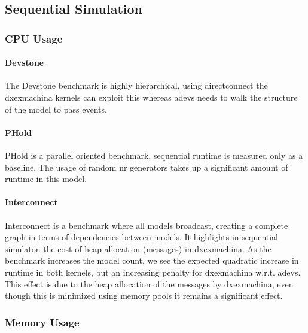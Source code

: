 \subsection{Sequential Simulation}
\subsubsection{CPU Usage}
\paragraph*{Devstone}
The Devstone \cite{DEVStone} benchmark is highly hierarchical, using directconnect the dxexmachina kernels can exploit this whereas adevs needs to walk the structure of the model to pass events.
\paragraph*{PHold}
PHold \cite{PHOLD} is a parallel oriented benchmark, sequential runtime is measured only as a baseline. The usage of random nr generators takes up a significant amount of runtime in this model.
\paragraph*{Interconnect}
Interconnect is a benchmark where all models broadcast, creating a complete graph in terms of dependencies between models. It highlights in sequential simulaton the cost of heap allocation (messages) in dxexmachina. As the benchmark increases the model count, we see the expected quadratic increase in runtime in both kernels, but an increasing penalty for dxexmachina w.r.t. adevs. This effect is due to the heap allocation of the messages by dxexmachina, even though this is minimized using memory pools it remains a significant effect.
\subsubsection{Memory Usage}
